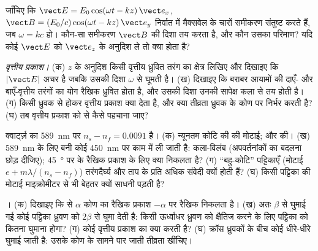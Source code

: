 \begin{exercise}[$\star$]\label{exo:b2:plane-waves-polarization:4}
जाँचिए कि $\vect E = E_0\cos(\omega t - kz)\,\vect e_x$, $\vect B = (E_0/c)\cos(\omega t
- kz)\,\vect e_y$ निर्वात में मैक्सवेल के चारों समीकरण संतुष्ट करते हैं, जब $\omega =
kc$ हो। कौन-सा समीकरण $\vect B$ की दिशा तय करता है, और कौन उसका
परिमाण? यदि कोई $\vect E$ को $\vect e_z$ के अनुदिश ले तो क्या होता है?
\end{exercise}

\begin{exercise}[$\star\star$]\label{exo:b2:plane-waves-polarization:5}
\emph{वृत्तीय प्रकाश।} (क) $z$ के अनुदिश किसी वृत्तीय ध्रुवित
तरंग का क्षेत्र लिखिए और दिखाइए कि $|\vect E|$ अचर है जबकि उसकी दिशा
$\omega$ से घूमती है। (ख) दिखाइए कि बराबर आयामों की दाएँ- और बाएँ-वृत्तीय
तरंगों का योग रैखिक ध्रुवित होता है, और उसकी दिशा
उनकी सापेक्ष कला से तय होती है। (ग) किसी ध्रुवक से होकर वृत्तीय प्रकाश
क्या देता है, और क्या तीव्रता ध्रुवक के कोण पर निर्भर करती है? (घ) तब
वृत्तीय प्रकाश को  से कैसे पहचाना जाए?
\end{exercise}

\begin{exercise}[$\star\star$]\label{exo:b2:plane-waves-polarization:6}
क्वार्ट्ज़ का \qty{589}{nm} पर $n_s - n_f = 0.0091$ है। (क) न्यूनतम कोटि की
 की मोटाई; और  की। (ख)
\qty{589}{nm} के लिए बनी कोई  \qty{450}{nm} पर काम में ली जाती है: कला-विलंब
(अपवर्तनांकों का बदलना छोड़ दीजिए); \qty{45}{\degree} पर के रैखिक प्रकाश के लिए
क्या निकलता है? (ग) ``बहु-कोटि'' पट्टिकाएँ (मोटाई $e +
m\lambda/(n_s - n_f)$) तरंगदैर्घ्य और ताप के प्रति अधिक संवेदी क्यों होती हैं? (घ)
किसी पट्टिका की मोटाई माइक्रोमीटर से भी बेहतर क्यों साधनी पड़ती है?
\end{exercise}

\begin{exercise}[$\star\star$]\label{exo:b2:plane-waves-polarization:7}
। (क) दिखाइए कि  से $\alpha$ कोण का रैखिक
प्रकाश $-\alpha$ पर रैखिक निकलता है। (ख) अतः $\beta$ से घुमाई गई कोई पट्टिका
ध्रुवण को $2\beta$ से घुमा देती है: किसी ऊर्ध्वाधर ध्रुवण को क्षैतिज करने के लिए
पट्टिका को कितना घुमाना होगा? (ग) कोई  वृत्तीय प्रकाश का
क्या करती है? (घ) क्रॉस ध्रुवकों के बीच कोई  धीरे-धीरे
घुमाई जाती है: उसके कोण के सामने पार जाती तीव्रता खींचिए।
\end{exercise}

